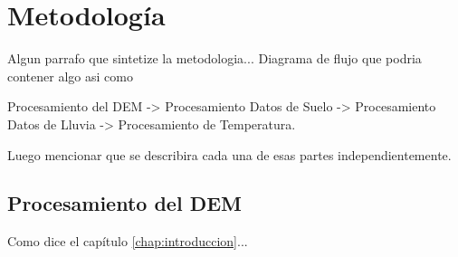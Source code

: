 \chapter{Metodología}
\label{chap:metodologia}

Algun parrafo que sintetize la metodologia... Diagrama de flujo que podria contener algo asi como

Procesamiento del DEM -> Procesamiento Datos de Suelo -> Procesamiento Datos de Lluvia -> Procesamiento de Temperatura.

Luego mencionar que se describira cada una de esas partes independientemente.

\section{Procesamiento del DEM}




 
 
  Como dice el capítulo \ref{chap:introduccion}...

% 
% 
